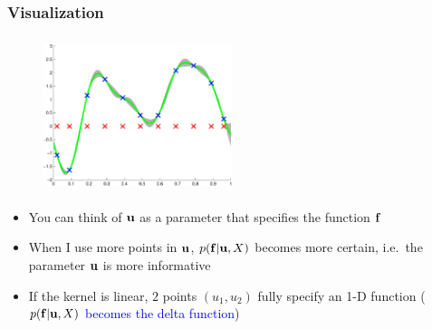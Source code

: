 \documentclass{beamer}
\begin{document}
\frame
{

\frametitle{Visualization} 


\begin{figure}
\includegraphics[width=55mm,height=45mm]{../../../vargplvm/tex/diagrams/Ind2}
\end{figure}

\begin{itemize}

\item You can think of $\mathbf{u}$ as a parameter that 
      specifies the function $\mathbf{f}$

\item When I use more  points in $\mathbf{u}$, 
      $p(\mathbf{f}|\mathbf{u},X)$ becomes more certain, i.e.\ 
      the parameter $\mathbf{u}$ is more informative

\item If the kernel is linear, $2$ points $(u_1,u_2)$
      fully specify an 1-D function (\textcolor{blue}{$p(\mathbf{f}|\mathbf{u},X)$ 
      becomes the delta function})
      


\end{itemize}

}
\end{document}

